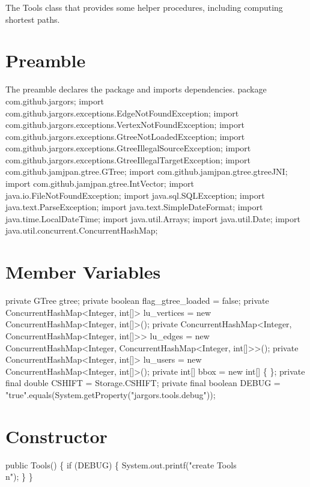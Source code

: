 The Tools class that provides some helper procedures, including computing
shortest paths.

\section{Preamble}
The preamble declares the package and imports dependencies.
\nwenddocs{}\endmoddef{}
package com.github.jargors;
import com.github.jargors.exceptions.EdgeNotFoundException;
import com.github.jargors.exceptions.VertexNotFoundException;
import com.github.jargors.exceptions.GtreeNotLoadedException;
import com.github.jargors.exceptions.GtreeIllegalSourceException;
import com.github.jargors.exceptions.GtreeIllegalTargetException;
import com.github.jamjpan.gtree.GTree;
import com.github.jamjpan.gtree.gtreeJNI;
import com.github.jamjpan.gtree.IntVector;
import java.io.FileNotFoundException;
import java.sql.SQLException;
import java.text.ParseException;
import java.text.SimpleDateFormat;
import java.time.LocalDateTime;
import java.util.Arrays;
import java.util.Date;
import java.util.concurrent.ConcurrentHashMap;
\nwendcode{}\nwdocspar

\section{Member Variables}
\nwenddocs{}\endmoddef{}
private GTree gtree;
private boolean flag_gtree_loaded = false;
private ConcurrentHashMap<Integer, int[]> lu_vertices = new ConcurrentHashMap<Integer, int[]>();
private ConcurrentHashMap<Integer,
    ConcurrentHashMap<Integer, int[]>>    lu_edges    = new ConcurrentHashMap<Integer, ConcurrentHashMap<Integer, int[]>>();
private ConcurrentHashMap<Integer, int[]> lu_users    = new ConcurrentHashMap<Integer, int[]>();
private int[] bbox = new int[] \{ \};
private final double CSHIFT = Storage.CSHIFT;
private final boolean DEBUG = "true".equals(System.getProperty("jargors.tools.debug"));
\nwendcode{}\nwdocspar

\section{Constructor}
\nwenddocs{}\endmoddef{}
public Tools() \{
  if (DEBUG) \{
    System.out.printf("create Tools\\n");
  \}
\}
\nwendcode{}\nwdocspar

